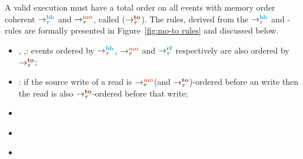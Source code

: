 A valid \cc execution must have a total order on all events with memory
order \sc coherent \wrt $\setHB$ and $\setMO$, called  
($\setTO$).
%
The \lto rules, derived from the $\setHB$ and \lmo-rules are formally presented in 
Figure~\ref{fig:mo-to rules} and discussed below.

\begin{itemize}
	\item {}, ,: events ordered by $\setHB$, $\setMO$
						and $\setRF$ respectively are also ordered by $\setTO$;
	\item {}: if the source write of a \sc read is $\setMO$(and $\setTO$)-ordered 
						before an \sc write then the read is also $\setTO$-ordered
						before that write;
	\item {}
	\item \href{toFFrf}{}
	\item \href{toFFnrf}{}
\end{itemize}